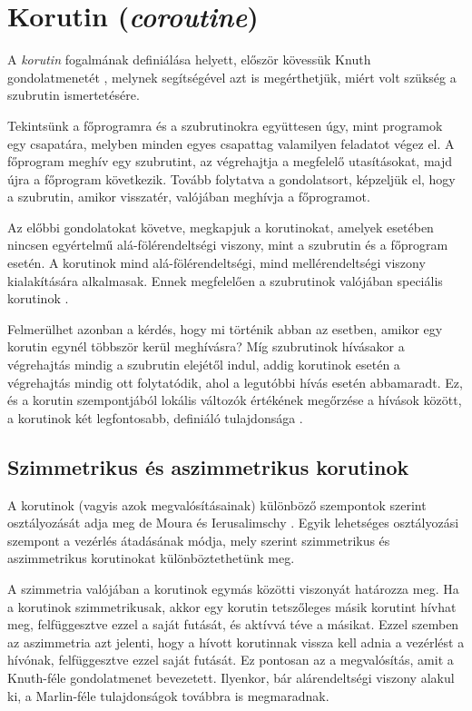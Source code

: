 \section{Korutin (\textit{coroutine})}

A \textit{korutin} fogalmának definiálása helyett, először kövessük Knuth gondolatmenetét \cite[p. 190]{TAoCPVol1}, melynek segítségével azt is megérthetjük, miért volt szükség a szubrutin ismertetésére.

Tekintsünk a főprogramra és a szubrutinokra együttesen úgy, mint programok egy csapatára, melyben minden egyes csapattag valamilyen feladatot végez el. A főprogram meghív egy szubrutint, az végrehajtja a megfelelő utasításokat, majd újra a főprogram következik. Tovább folytatva a gondolatsort, képzeljük el, hogy a szubrutin, amikor visszatér, valójában meghívja a főprogramot. 

Az előbbi gondolatokat követve, megkapjuk a korutinokat, amelyek esetében nincsen egyértelmű alá-fölérendeltségi viszony, mint a szubrutin és a főprogram esetén. A korutinok mind alá-fölérendeltségi, mind mellérendeltségi viszony kialakítására alkalmasak. Ennek megfelelően a szubrutinok valójában speciális korutinok \cite[p. 190]{TAoCPVol1}.

Felmerülhet azonban a kérdés, hogy mi történik abban az esetben, amikor egy korutin egynél többször kerül meghívásra? Míg szubrutinok hívásakor a végrehajtás mindig a szubrutin elejétől indul, addig korutinok esetén a végrehajtás mindig ott folytatódik, ahol a legutóbbi hívás esetén abbamaradt. Ez, és a korutin szempontjából lokális változók értékének megőrzése a hívások között, a korutinok két legfontosabb, definiáló tulajdonsága \cite{Marlin1980}.

\subsection{Szimmetrikus és aszimmetrikus korutinok}

A korutinok (vagyis azok megvalósításainak) különböző szempontok szerint osztályozását adja meg de Moura és Ierusalimschy \citeyear{RevisitingCoroutines}. Egyik lehetséges osztályozási szempont a vezérlés átadásának módja, mely szerint szimmetrikus és aszimmetrikus korutinokat különböztethetünk meg.

A szimmetria valójában a korutinok egymás közötti viszonyát határozza meg. Ha a korutinok szimmetrikusak, akkor egy korutin tetszőleges másik korutint hívhat meg, felfüggesztve ezzel a saját futását, és aktívvá téve a másikat. Ezzel szemben az aszimmetria azt jelenti, hogy a hívott korutinnak vissza kell adnia a vezérlést a hívónak, felfüggesztve ezzel saját futását. Ez pontosan az a megvalósítás, amit a Knuth-féle gondolatmenet bevezetett. Ilyenkor, bár alárendeltségi viszony alakul ki, a Marlin-féle tulajdonságok továbbra is megmaradnak.

